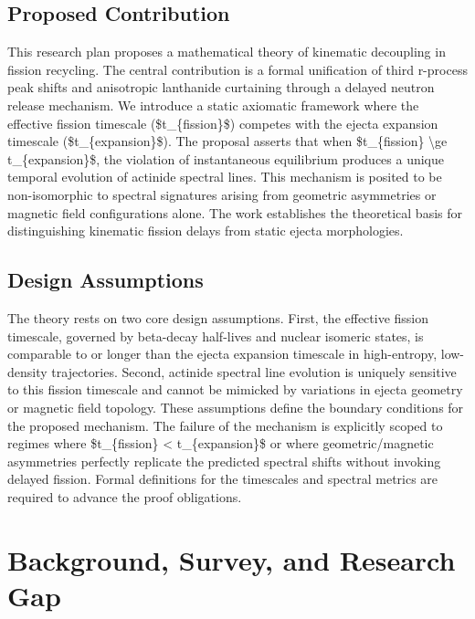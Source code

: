 \documentclass[conference]{IEEEtran}
\begin{document}
\subsection{Proposed Contribution}
This research plan proposes a mathematical theory of kinematic decoupling in fission recycling. The central contribution is a formal unification of third r-process peak shifts and anisotropic lanthanide curtaining through a delayed neutron release mechanism. We introduce a static axiomatic framework where the effective fission timescale (\$t\_\{fission\}\$) competes with the ejecta expansion timescale (\$t\_\{expansion\}\$). The proposal asserts that when \$t\_\{fission\} \textbackslash{}ge t\_\{expansion\}\$, the violation of instantaneous equilibrium produces a unique temporal evolution of actinide spectral lines. This mechanism is posited to be non-isomorphic to spectral signatures arising from geometric asymmetries or magnetic field configurations alone. The work establishes the theoretical basis for distinguishing kinematic fission delays from static ejecta morphologies.

\subsection{Design Assumptions}
The theory rests on two core design assumptions. First, the effective fission timescale, governed by beta-decay half-lives and nuclear isomeric states, is comparable to or longer than the ejecta expansion timescale in high-entropy, low-density trajectories. Second, actinide spectral line evolution is uniquely sensitive to this fission timescale and cannot be mimicked by variations in ejecta geometry or magnetic field topology. These assumptions define the boundary conditions for the proposed mechanism. The failure of the mechanism is explicitly scoped to regimes where \$t\_\{fission\} < t\_\{expansion\}\$ or where geometric/magnetic asymmetries perfectly replicate the predicted spectral shifts without invoking delayed fission. Formal definitions for the timescales and spectral metrics are required to advance the proof obligations.

\section{Background, Survey, and Research Gap}
\end{document}
